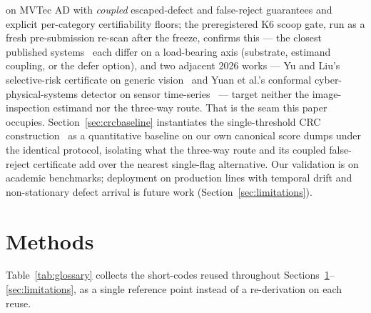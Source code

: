 \documentclass[preprint,11pt]{elsarticle}
\begin{document}
on MVTec AD with \emph{coupled} escaped-defect and false-reject guarantees and explicit
per-category certifiability floors; the preregistered K6 scoop gate, run as a fresh pre-submission
re-scan after the freeze, confirms this --- the closest published
systems~\citep{kumar2025beyond,bai2025crcsgad,shen2025conformal} each differ on a load-bearing axis
(substrate, estimand coupling, or the defer option), and two adjacent 2026 works ---
Yu and Liu's selective-risk certificate on generic vision~\citep{yu2026selective} and
Yuan et al.'s conformal cyber-physical-systems detector on sensor
time-series~\citep{yuan2026conformal} --- target neither the image-inspection estimand nor the
three-way route. That
is the seam this paper occupies. Section~\ref{sec:crcbaseline} instantiates the single-threshold
CRC construction~\citep{angelopoulos2022crc} as a quantitative baseline on our own canonical score
dumps under the identical protocol, isolating what the three-way route and its coupled
false-reject certificate add over the nearest single-flag alternative. Our validation is on academic benchmarks;
deployment on production lines with temporal drift and non-stationary defect arrival is future work (Section~\ref{sec:limitations}).

\section{Methods}
\label{sec:methods}

Table~\ref{tab:glossary} collects the short-codes reused throughout
Sections~\ref{sec:methods}--\ref{sec:limitations}, as a single reference point instead of a
re-derivation on each reuse.
\end{document}
